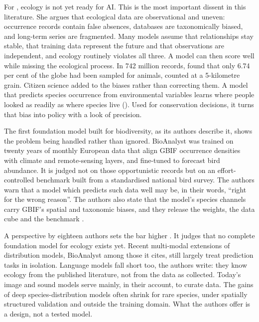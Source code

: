 For \textcite{mishra2026notready}, ecology is not yet ready for AI. This is the
most important dissent in this literature. She argues that ecological data are
observational and uneven: occurrence records contain false absences, databases
are taxonomically biased, and long-term series are fragmented. Many models
assume that relationships stay stable, that training data represent the future
and that observations are independent, and ecology routinely violates all
three. A model can then score well while missing the ecological process. In
742 million records, \textcite{hughes2021sampling} found that only 6.74 per
cent of the globe had been sampled for animals, counted at a 5-kilometre grain.
Citizen science added to the biases rather than correcting them. A model that
predicts species occurrence from environmental variables learns where people looked as readily as where species live
(). Used for
conservation decisions, it turns that bias into policy with a look of
precision.

The first foundation model built for biodiversity, as its authors describe
it, shows the problem being handled rather than ignored. BioAnalyst was
trained on twenty years of monthly European data that align GBIF occurrence
densities with climate and remote-sensing layers, and fine-tuned to forecast
bird abundance. It is judged not on those opportunistic records but on an
effort-controlled benchmark built from a standardised national bird survey.
The authors warn that a model which predicts such data well may be, in their
words, ``right for the wrong reason''. The authors also state that the model's species channels
carry GBIF's spatial and taxonomic biases, and they release the weights, the
data cube and the benchmark \parencite{trantas2026bioanalyst}.

A perspective by eighteen authors sets the bar higher
\parencite{gardiner2026foundation}. It judges that no complete foundation model
for ecology exists yet. Recent multi-modal extensions of distribution models,
BioAnalyst among those it cites, still largely treat prediction tasks in
isolation.
Language models fall short too, the authors write: they know ecology from the
published literature, not from the data as collected. Today's image and sound
models serve mainly, in their account, to curate data. The gains of deep
species-distribution models often shrink for rare species, under spatially
structured validation and outside the training domain. What the authors offer
is a design, not a tested model.

